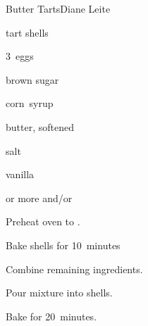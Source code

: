 \begin{recipe}{Butter Tarts}{Diane Leite}{}

\begin{ingredients}
\item tart shells
\item 3~eggs
\item {} brown sugar
\item \C{\half} corn~syrup
\item \C{\quarter} butter, softened
\item \tp{\half} salt
\item {} vanilla
\item {} or more  and/or 
\end{ingredients}

\begin{directions}
\item Preheat oven to .
\item Bake shells for 10~minutes
\item Combine remaining ingredients.
\item Pour mixture into shells.
\item Bake for 20~minutes.
\end{directions}

\end{recipe}

